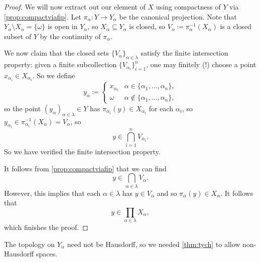 \documentclass[../notes.tex]{subfiles}
\begin{document}
\begin{proof}
	We will now extract out our element of $X$ using compactness of $Y$ via \autoref{prop:compactviafip}. Let $\pi_\alpha\colon Y\to Y_\alpha$ be the canonical projection. Note that $Y_\alpha\setminus X_\alpha=\{\omega\}$ is open in $Y_\alpha$, so $X_\alpha\subseteq Y_\alpha$ is closed, so $V_\alpha\coloneqq\pi_\alpha^{-1}(X_\alpha)$ is a closed subset of $Y$ by the continuity of $\pi_\alpha$.

	We now claim that the closed sets $\{V_\alpha\}_{\alpha\in\lambda}$ satisfy the finite intersection property: given a finite subcollection $\{V_{\alpha_i}\}_{i=1}^n$, one may finitely (!) choose a point $x_{\alpha_i}\in X_{\alpha_i}$. So we define
	\[y_\alpha\coloneqq\begin{cases}
		x_{\alpha_i} & \alpha\in\{\alpha_1,\ldots,\alpha_n\}, \\
		\omega & \alpha\notin\{\alpha_1,\ldots,\alpha_n\},
	\end{cases}\]
	so the point $(y_\alpha)_{\alpha\in\lambda}\in Y$ has $\pi_{\alpha_i}(y)\in X_{\alpha_i}$ for each $\alpha_i$, so $y_{\alpha_i}\in\pi_{\alpha_i}^{-1}(X_\alpha)=V_\alpha$, so
	\[y\in\bigcap_{i=1}^nV_{\alpha_i}.\]
	So we have verified the finite intersection property.

	It follows from \autoref{prop:compactviafip} that we can find
	\[y\in\bigcap_{\alpha\in\lambda}V_\alpha.\]
	However, this implies that each $\alpha\in\lambda$ has $y\in V_\alpha$ and so $\pi_\alpha(y)\in X_\alpha$. It follows that
	\[y\in\prod_{\alpha\in\lambda}X_\alpha,\]
	which finishes the proof.
\end{proof}
\begin{remark}
	The topology on $Y_\alpha$ need not be Hausdorff, so we needed \autoref{thm:tych} to allow non-Hausdorff spaces.
\end{remark}
\end{document}
